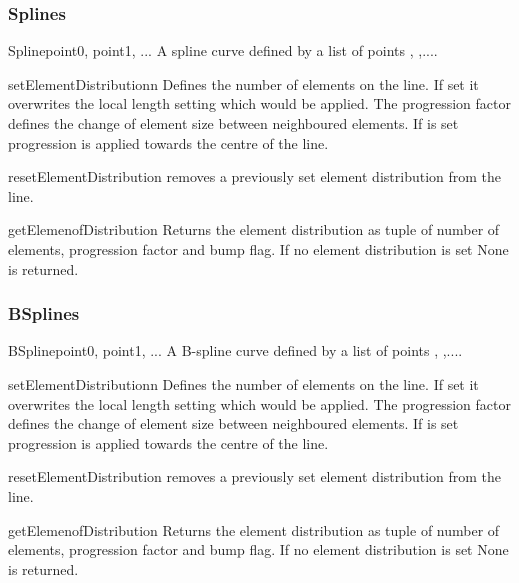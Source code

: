 \subsubsection{Splines}
\begin{classdesc}{Spline}{point0, point1, ...}
A spline curve defined by a list of points , ,....
\end{classdesc}
\begin{methoddesc}[Spline]{setElementDistribution}{n}
Defines the number of elements on the line. If set it overwrites the local length setting which would be applied. The progression factor  defines the change of element size between neighboured elements. If  is set
progression is applied towards the centre of the line.
\end{methoddesc}
\begin{methoddesc}[Spline]{resetElementDistribution}{}
removes a previously set element distribution from the line.
\end{methoddesc}
\begin{methoddesc}[Spline]{getElemenofDistribution}{}
Returns the element distribution as tuple of
number of elements, progression factor and bump flag. If
no element distribution is set None is returned.
\end{methoddesc}

\subsubsection{BSplines}
\begin{classdesc}{BSpline}{point0, point1, ...}
A B-spline curve defined by a list of points , ,....
\end{classdesc}
\begin{methoddesc}[BSpline]{setElementDistribution}{n}
Defines the number of elements on the line. If set it overwrites the local length setting which would be applied. The progression factor  defines the change of element size between neighboured elements. If  is set
progression is applied towards the centre of the line.
\end{methoddesc}
\begin{methoddesc}[BSpline]{resetElementDistribution}{}
removes a previously set element distribution from the line.
\end{methoddesc}
\begin{methoddesc}[BSpline]{getElemenofDistribution}{}
Returns the element distribution as tuple of
number of elements, progression factor and bump flag. If
no element distribution is set None is returned.
\end{methoddesc}


